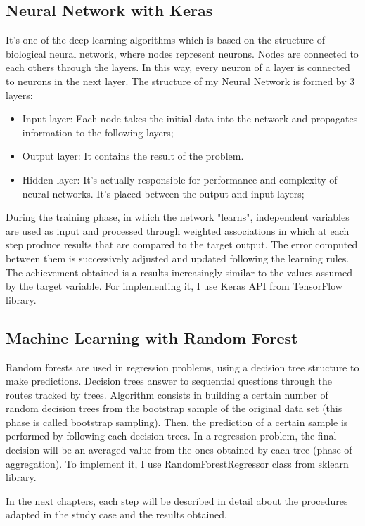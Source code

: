 \subsection{Neural Network with Keras}
It's one of the deep learning algorithms which is based on the structure of biological neural network, where nodes represent neurons.
Nodes are connected to each others through the layers. 
In this way, every neuron of a layer is connected to neurons in the next layer.
The structure of my Neural Network is formed by 3 layers:
\begin{itemize}
    \item Input layer: Each node takes the initial data into the network and propagates information to the following layers;
    \item Output layer: It contains the result of the problem. 
    \item Hidden layer: It's actually responsible for performance and complexity of neural networks. It's placed between the output and input layers;
\end{itemize}
During the training phase, in which the network "learns", independent variables are used as input and processed through weighted associations in which at each step produce results that are compared to the target output. The error computed between them is successively adjusted and updated following the learning rules. The achievement obtained is a results increasingly similar to the values assumed by the target variable. 
For implementing it, I use Keras API from TensorFlow library.


\subsection{Machine Learning with Random Forest}
Random forests are used in regression problems, using a decision tree structure to make predictions. Decision trees answer to sequential questions through the routes tracked by trees.
Algorithm consists in building a certain number of random decision trees from the bootstrap sample of the original data set (this phase is called bootstrap sampling). Then, the prediction of a certain sample is performed by following each decision trees. In a regression problem, the final decision will be an averaged value from the ones obtained by each tree (phase of aggregation).
To implement it, I use RandomForestRegressor class from sklearn library. 

\bigbreak
In the next chapters, each step will be described in detail about the procedures adapted in the study case and the results obtained.

